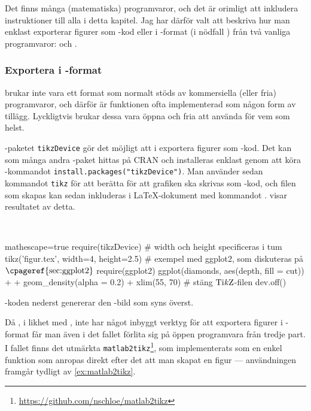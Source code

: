 \documentclass[lang=sv,ptsize=10pt,font=none,nomath,titles=bf,../../a4.tex]{subfiles}
\begin{document}
Det finns många (matematiska) programvaror, och det är orimligt att
inkludera instruktioner till alla i detta kapitel. Jag har därför valt
att beskriva hur man enklast exporterar figurer som \PGFTikZ-kod eller
i \PDF-format (i nödfall \PNG) från två vanliga programvaror:
\Rlogo och \MATLAB.

\subsubsection{Exportera i \PGFTikZ-format}
\PGFTikZ brukar inte vara ett format som normalt stöds av kommersiella
(eller fria) programvaror, och därför är funktionen ofta implementerad
som någon form av tillägg. Lyckligtvis brukar dessa vara öppna och fria
att använda för vem som helst.

\Rlogo-paketet \texttt{tikzDevice} \parencite{Sharpsteen12} gör det möjligt
att i \Rlogo exportera figurer som \PGFTikZ-kod. Det kan som många andra
\Rlogo-paket hittas på CRAN och installeras enklast genom att köra
\Rlogo-kommandot \verb|install.packages("tikzDevice")|. Man använder
sedan kommandot \texttt{tikz} för att berätta för \Rlogo att grafiken
ska skrivas som \PGFTikZ-kod, och filen som skapas kan sedan inkluderas
i \LaTeX-dokument med kommandot .
 visar resultatet av detta.

\begin{kod}[tbp]
	\centering
	\begin{minipage}{\textwidth}
		\centering
		
	\end{minipage}
	\\[1ex]
	\begin{minipage}{\textwidth}
		\begin{rcode*}{mathescape=true}
require(tikzDevice)
# width och height specificeras i tum
tikz('figur.tex', width=4, height=2.5)
# exempel med ggplot2, som diskuteras på $\text{\cpageref{sec:ggplot2}}$
require(ggplot2)
ggplot(diamonds, aes(depth, fill = cut)) +
  + geom_density(alpha = 0.2) + xlim(55, 70)
# stäng $\text{Ti\textit{k}Z}$-filen
dev.off()
		\end{rcode*}
	\end{minipage}
	\caption{\Rlogo-koden nederst genererar den \PGFTikZ-bild som
	syns överst.}
	\label{ex:tikzdevice}
\end{kod}

\label{sec:matlab2tikz}
Då \MATLAB, i likhet med \Rlogo, inte har något inbyggt verktyg för att
exportera figurer i \PGFTikZ-format får man även i det fallet förlita sig
på öppen programvara från tredje part. I fallet \MATLAB finns det utmärkta
\texttt{matlab2tikz}\footnote{\url{https://github.com/nschloe/matlab2tikz}},
som implementerats som en enkel funktion som anropas direkt efter det
att man skapat en figur — användningen framgår tydligt av \cref{ex:matlab2tikz}.
\end{document}
